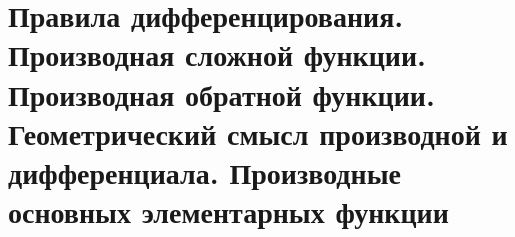 \section{Правила дифференцирования. Производная сложной функции. Производная обратной функции. Геометрический смысл производной и дифференциала. Производные основных элементарных функции}